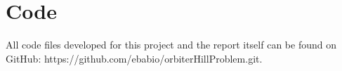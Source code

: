\section{Code}

All code files developed for this project and the report itself can be found on GitHub: https://github.com/ebabio/orbiterHillProblem.git.